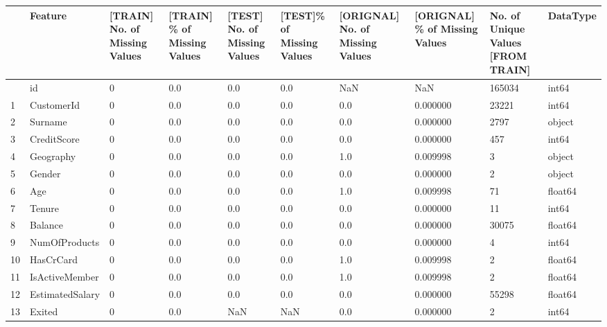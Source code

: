 \documentclass[
  letterpaper,
  DIV=11,
  numbers=noendperiod]{scrartcl}
\begin{document}
\begin{longtable}[]{@{}llllllllll@{}}
\toprule\noalign{}
& Feature & {[}TRAIN{]} No. of Missing Values & {[}TRAIN{]} \% of
Missing Values & {[}TEST{]} No. of Missing Values & {[}TEST{]}\% of
Missing Values & {[}ORIGNAL{]} No. of Missing Values & {[}ORIGNAL{]} \%
of Missing Values & No. of Unique Values {[}FROM TRAIN{]} & DataType \\
\midrule\noalign{}
\endhead
\bottomrule\noalign{}
\endlastfoot
0 & id & 0 & 0.0 & 0.0 & 0.0 & NaN & NaN & 165034 & int64 \\
1 & CustomerId & 0 & 0.0 & 0.0 & 0.0 & 0.0 & 0.000000 & 23221 & int64 \\
2 & Surname & 0 & 0.0 & 0.0 & 0.0 & 0.0 & 0.000000 & 2797 & object \\
3 & CreditScore & 0 & 0.0 & 0.0 & 0.0 & 0.0 & 0.000000 & 457 & int64 \\
4 & Geography & 0 & 0.0 & 0.0 & 0.0 & 1.0 & 0.009998 & 3 & object \\
5 & Gender & 0 & 0.0 & 0.0 & 0.0 & 0.0 & 0.000000 & 2 & object \\
6 & Age & 0 & 0.0 & 0.0 & 0.0 & 1.0 & 0.009998 & 71 & float64 \\
7 & Tenure & 0 & 0.0 & 0.0 & 0.0 & 0.0 & 0.000000 & 11 & int64 \\
8 & Balance & 0 & 0.0 & 0.0 & 0.0 & 0.0 & 0.000000 & 30075 & float64 \\
9 & NumOfProducts & 0 & 0.0 & 0.0 & 0.0 & 0.0 & 0.000000 & 4 & int64 \\
10 & HasCrCard & 0 & 0.0 & 0.0 & 0.0 & 1.0 & 0.009998 & 2 & float64 \\
11 & IsActiveMember & 0 & 0.0 & 0.0 & 0.0 & 1.0 & 0.009998 & 2 &
float64 \\
12 & EstimatedSalary & 0 & 0.0 & 0.0 & 0.0 & 0.0 & 0.000000 & 55298 &
float64 \\
13 & Exited & 0 & 0.0 & NaN & NaN & 0.0 & 0.000000 & 2 & int64 \\
\end{longtable}
\end{document}
